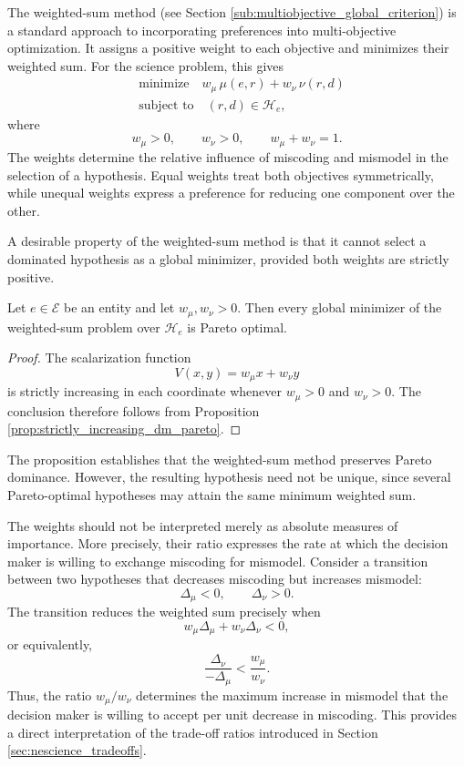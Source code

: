 The weighted-sum method (see Section \ref{sub:multiobjective_global_criterion}) is a standard approach to incorporating preferences into multi-objective optimization. It assigns a positive weight to each objective and minimizes their weighted sum. For the science problem, this gives
\begin{align*}
& \text{minimize} \quad w_\mu\,\mu(e,r)+w_\nu\,\nu(r,d) \\
& \text{subject to} \quad (r,d)\in\mathcal H_e,
\end{align*}
where
\[
w_\mu>0, \qquad w_\nu>0, \qquad w_\mu + w_\nu = 1.
\]
The weights determine the relative influence of miscoding and mismodel in the selection of a hypothesis. Equal weights treat both objectives symmetrically, while unequal weights express a preference for reducing one component over the other.

A desirable property of the weighted-sum method is that it
cannot select a dominated hypothesis as a global minimizer,
provided both weights are strictly positive.

\begin{proposition}
Let $e\in\mathcal E$ be an entity and let $w_\mu,w_\nu>0$. Then every global minimizer of the weighted-sum problem over $\mathcal H_e$ is Pareto optimal.
\end{proposition}
\begin{proof}
The scalarization function
\[
V(x,y)=w_\mu x+w_\nu y
\]
is strictly increasing in each coordinate whenever $w_\mu>0$ and $w_\nu>0$. The conclusion therefore follows from Proposition \ref{prop:strictly_increasing_dm_pareto}.
\end{proof}

The proposition establishes that the weighted-sum method preserves Pareto dominance. However, the resulting hypothesis need not be unique, since several Pareto-optimal hypotheses may attain the same minimum weighted sum.

The weights should not be interpreted merely as absolute measures of importance. More precisely, their ratio expresses the rate at which the decision maker is willing to exchange miscoding for mismodel. Consider a transition between two hypotheses that decreases miscoding but increases mismodel:
\[
\Delta_\mu<0, \qquad \Delta_\nu>0.
\]
The transition reduces the weighted sum precisely when
\[
w_\mu\Delta_\mu + w_\nu\Delta_\nu < 0,
\]
or equivalently,
\[
\frac{\Delta_\nu}{-\Delta_\mu} < \frac{w_\mu}{w_\nu}.
\]
Thus, the ratio $w_\mu/w_\nu$ determines the maximum increase in mismodel that the decision maker is willing to accept per unit decrease in miscoding. This provides a direct interpretation of the trade-off ratios introduced in Section \ref{sec:nescience_tradeoffs}.

